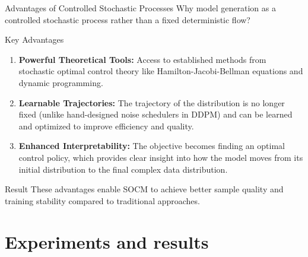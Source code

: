 \documentclass[aspectratio=169,xcolor=dvipsnames]{beamer}
\begin{document}
\begin{frame}{Advantages of Controlled Stochastic Processes}
    Why model generation as a controlled stochastic process rather than a fixed deterministic flow?
    
    \vspace{0.4cm}
    
    \begin{block}{Key Advantages}
        \begin{enumerate}
            \item \textbf{Powerful Theoretical Tools:} Access to established methods from stochastic optimal control theory like Hamilton-Jacobi-Bellman equations and dynamic programming.
            
            \vspace{0.2cm}
            
            \item \textbf{Learnable Trajectories:} The trajectory of the distribution is no longer fixed (unlike hand-designed noise schedulers in DDPM) and can be learned and optimized to improve efficiency and quality.
            
            \vspace{0.2cm}
            
            \item \textbf{Enhanced Interpretability:} The objective becomes finding an optimal control policy, which provides clear insight into how the model moves from its initial distribution to the final complex data distribution.
        \end{enumerate}
    \end{block}
    
    \vspace{0.3cm}
    
    \begin{alertblock}{Result}
        These advantages enable SOCM to achieve better sample quality and training stability compared to traditional approaches.
    \end{alertblock}
\end{frame}


\section{Experiments and results}
\end{document}
